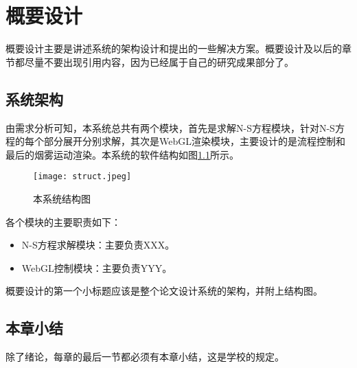 \chapter{概要设计}

概要设计主要是讲述系统的架构设计和提出的一些解决方案。概要设计及以后的章节都尽量不要出现引用内容，因为已经属于自己的研究成果部分了。

\section{系统架构}

由需求分析可知，本系统总共有两个模块，首先是求解N-S方程模块，针对N-S方程的每个部分展开分别求解，其次是WebGL渲染模块，主要设计的是流程控制和最后的烟雾运动渲染。本系统的软件结构如图\ref{fig:struct}所示。

\begin{figure}[ht]
\centering
\texttt{[image: struct.jpeg]}
\caption{本系统结构图} \label{fig:struct}
\end{figure}

各个模块的主要职责如下：

\begin{itemize}
  \item N-S方程求解模块：主要负责XXX。
  \item WebGL控制模块：主要负责YYY。
\end{itemize}

概要设计的第一个小标题应该是整个论文设计系统的架构，并附上结构图。

\section{本章小结}

除了绪论，每章的最后一节都必须有本章小结，这是学校的规定。